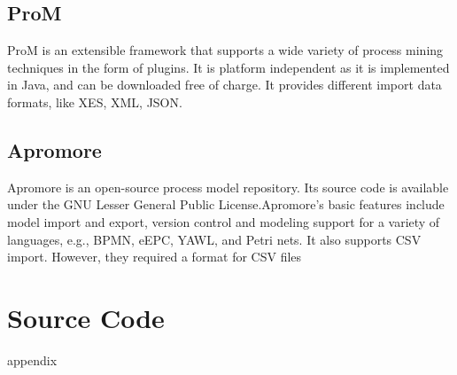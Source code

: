 \subsection{ProM}
ProM is an extensible framework that supports a wide variety of process mining techniques in the form of plugins. 
It is platform independent as it is implemented in Java, and can be downloaded free of charge. It provides different import data formats, like XES, XML, JSON.
\subsection{Apromore}
Apromore is an open-source process model repository. Its source code is available under the GNU Lesser General Public License.Apromore’s basic features include model import and export, version control and modeling support for a variety of languages, e.g., BPMN,
eEPC, YAWL, and Petri nets. It also supports CSV import. However, they required a format for CSV files 

\section{Source Code}

\todo appendix

